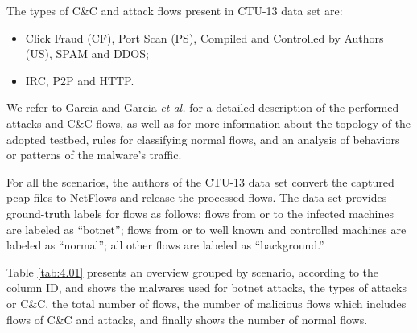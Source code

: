 The types of C\&C and attack flows present in CTU-13 data set are:

\begin{itemize}
	\item {} Click Fraud (CF), Port Scan (PS), Compiled and Controlled by Authors (US), SPAM and DDOS;
	\item {} IRC, P2P and HTTP.
\end{itemize}

We refer to Garcia \cite{garcia2014identifying} and Garcia \emph{et al.} \cite{garcia2014empirical} for a detailed description of the performed attacks and C\&C flows, as well as for more information about the topology of the adopted testbed, rules for classifying normal flows, and an analysis of behaviors or patterns of the malware's traffic.

For all the scenarios, the authors of the CTU-13 data set convert the captured pcap files to NetFlows and release the processed flows. The data set provides ground-truth labels for flows as follows: flows from or to the infected machines are labeled as “botnet”; flows from or to well known and controlled machines are labeled as “normal”; all other flows are labeled as “background.”

Table \ref{tab:4.01} presents an overview grouped by scenario, according to the column ID, and shows the malwares used for botnet attacks, the types of attacks or C\&C, the total number of flows, the number of malicious flows which includes flows of C\&C and attacks, and finally shows the number of normal flows.

